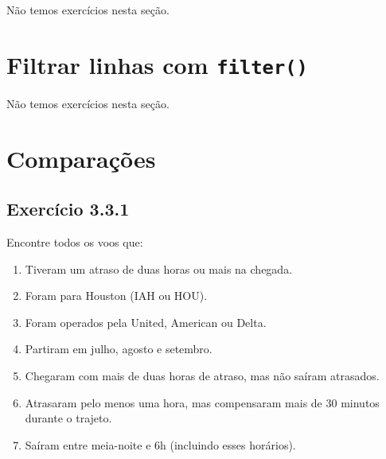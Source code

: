 \documentclass[
]{latex/krantz}
\providecommand{\tightlist}{%
  \setlength{\itemsep}{0pt}\setlength{\parskip}{0pt}}
\theoremstyle{definition}
\theoremstyle{definition}
\theoremstyle{definition}
\theoremstyle{definition}
\theoremstyle{remark}
\begin{document}
Não temos exercícios nesta seção.

\hypertarget{filtrar-linhas-com-filter}{%
\section{\texorpdfstring{Filtrar linhas com \texttt{filter()}}{Filtrar linhas com filter()}}\label{filtrar-linhas-com-filter}}

Não temos exercícios nesta seção.

\hypertarget{comparauxe7uxf5es}{%
\section{Comparações}\label{comparauxe7uxf5es}}

\hypertarget{exr3-3-1}{%
\subsection*{Exercício 3.3.1}\label{exr3-3-1}}

Encontre todos os voos que:

\begin{enumerate}
\def\labelenumi{\alph{enumi}.}
\tightlist
\item
  Tiveram um atraso de duas horas ou mais na chegada.
\item
  Foram para Houston (IAH ou HOU).
\item
  Foram operados pela United, American ou Delta.
\item
  Partiram em julho, agosto e setembro.
\item
  Chegaram com mais de duas horas de atraso, mas não saíram atrasados.
\item
  Atrasaram pelo menos uma hora, mas compensaram mais de 30 minutos durante o trajeto.
\item
  Saíram entre meia-noite e 6h (incluindo esses horários).
\end{enumerate}
\end{document}
